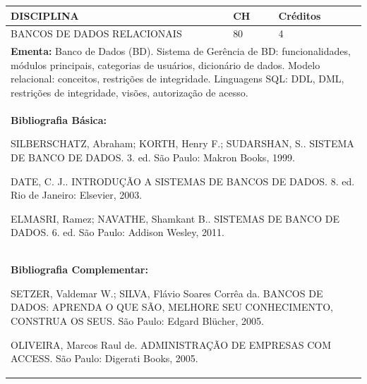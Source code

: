 \documentclass[a4paper, 12pt, openright, oneside, german, french, english, brazil]{abntex2}
\begin{document}
\begin{table}[!h]
  \footnotesize
  \centering
  \begin{tabular}{|p{100mm}|p{10mm}|p{20mm}|}
    \hline
    \textbf{DISCIPLINA} & \textbf{CH} & \textbf{Créditos} \\
    \hline
    BANCOS DE DADOS RELACIONAIS & 80 & 4 \\
    \hline
    \multicolumn{3}{|p{130mm}|}{\textbf{Ementa:}  Banco de Dados (BD). Sistema de Gerência de BD: funcionalidades, módulos principais, categorias de usuários, dicionário de dados. Modelo relacional: conceitos, restrições de integridade. Linguagens SQL: DDL, DML, restrições de integridade, visões, autorização de acesso.} \\
    \hline
    \multicolumn{3}{|p{130mm}|}{\textbf{Bibliografia Básica:}

    SILBERSCHATZ, Abraham; KORTH, Henry F.; SUDARSHAN, S.. SISTEMA DE BANCO DE DADOS. 3. ed. São Paulo: Makron Books, 1999.

DATE, C. J.. INTRODUÇÃO A SISTEMAS DE BANCOS DE DADOS. 8. ed. Rio de Janeiro: Elsevier, 2003.

ELMASRI, Ramez; NAVATHE, Shamkant B.. SISTEMAS DE BANCO DE DADOS. 6. ed. São Paulo: Addison Wesley, 2011.
} \\
    \hline
    \multicolumn{3}{|p{130mm}|}{\textbf{Bibliografia Complementar:}

    SETZER, Valdemar W.; SILVA, Flávio Soares Corrêa da. BANCOS DE DADOS: APRENDA O QUE SÃO, MELHORE SEU CONHECIMENTO, CONSTRUA OS SEUS. São Paulo: Edgard Blücher, 2005.

OLIVEIRA, Marcos Raul de. ADMINISTRAÇÃO DE EMPRESAS COM ACCESS. São Paulo: Digerati Books, 2005.
} \\
    \hline
  \end{tabular}
\end{table}
\end{document}

